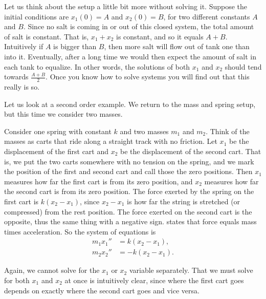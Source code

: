 \begin{example}
Let us think about the setup a little bit more without solving it.  Suppose the
initial conditions are $x_1(0) = A$ and $x_2(0) = B$, for two different
constants $A$ and $B$.  Since no salt is coming in or out of this closed system,
the total amount of salt is constant.  That is, $x_1+x_2$ is constant,
and so it equals $A+B$.
Intuitively if $A$ is bigger than $B$, then more salt will flow out of tank
one than into it.  Eventually, after a long time we would then expect
the amount of salt in each tank to equalize. In other words,
the solutions of both $x_1$ and $x_2$ should
tend towards $\frac{A+B}{2}$.  Once you know how to solve systems
you will find out that this really is so.
\end{example}

\begin{example} \label{sintro:carts-example}
Let us look at a second order example.
We return to the mass and spring setup, but this time we
consider two masses.

\begin{mywrapfigsimp}{2.0in}{2.3in}
\noindent
{}
\end{mywrapfigsimp}
Consider one spring with constant $k$ and two masses $m_1$
and $m_2$.  Think of the masses as carts that 
ride along a straight track with no friction.  Let $x_1$ be the displacement of the first
cart and $x_2$ be the displacement of the second cart.
That is, we put the two
carts somewhere with no tension on the spring, and we mark the position of
the first and second cart and call those the zero positions.
Then $x_1$ measures how far the first cart is from its zero position,
and $x_2$ measures how far the second cart is from its zero position.
The force exerted by the spring on the first cart is
$k(x_2-x_1)$,
since $x_2-x_1$ is how far the string is stretched (or compressed) from
the rest position.  The force exerted on the second cart is the opposite,
thus the same thing with a negative sign.
 states that
force equals mass times acceleration.  So the system of equations is
\begin{align*}
m_1 x_1'' & = k(x_2-x_1) , \\
m_2 x_2'' & = - k(x_2-x_1) .
\end{align*}

Again, we cannot solve for the $x_1$ or $x_2$ variable separately.
That we must solve for both $x_1$ and $x_2$ at once
is intuitively clear, since where the first cart goes
depends on exactly where the second cart goes and vice versa.
\end{example}

